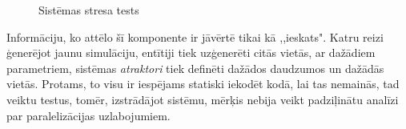 \begin{figure}[H]%
    \centering
    \qquad
    \caption{Sistēmas stresa tests}
    \label{img:test-single-vs-mutlicore}%
\end{figure}

Informāciju, ko attēlo šī komponente ir jāvērtē tikai kā ,,ieskats". Katru
reizi ģenerējot jaunu simulāciju, entītiji tiek uzģenerēti citās vietās, ar
dažādiem parametriem, sistēmas \emph{atraktori} tiek definēti dažādos daudzumos
un dažādās vietās.
Protams, to visu ir iespējams statiski iekodēt kodā, lai tas nemainās, tad veiktu
testus, tomēr,
izstrādājot sistēmu, mērķis nebija veikt padziļinātu analīzi par paralelizācijas
uzlabojumiem.
